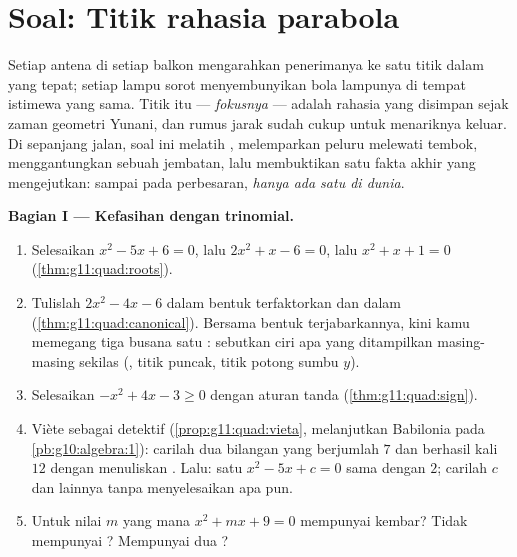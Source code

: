 \section{Soal: Titik rahasia parabola}

\begin{problem}
\label{pb:g11:quad:1}
Setiap antena  di setiap balkon mengarahkan penerimanya ke satu
titik dalam yang tepat; setiap lampu sorot menyembunyikan bola lampunya di
tempat istimewa yang sama. Titik itu --- \emph{fokusnya} --- adalah
rahasia yang disimpan  sejak zaman geometri Yunani, dan
rumus jarak sudah cukup untuk menariknya keluar. Di sepanjang jalan, soal
ini melatih , melemparkan peluru melewati tembok,
menggantungkan sebuah jembatan, lalu membuktikan satu fakta akhir yang
mengejutkan: sampai pada perbesaran, \emph{hanya ada satu  di dunia}.

\medskip
\noindent\textbf{Bagian I --- Kefasihan dengan trinomial.}
\begin{enumerate}
  \item Selesaikan $x^2 - 5x + 6 = 0$, lalu $2x^2 + x - 6 = 0$, lalu
        $x^2 + x + 1 = 0$ (\cref{thm:g11:quad:roots}).
  \item Tulislah $2x^2 - 4x - 6$ dalam bentuk terfaktorkan dan dalam  (\cref{thm:g11:quad:canonical}). Bersama bentuk
        terjabarkannya, kini kamu memegang tiga busana satu
        : sebutkan ciri apa yang ditampilkan masing-masing sekilas
        (, titik puncak, titik potong sumbu $y$).
  \item Selesaikan $-x^2 + 4x - 3 \geq 0$ dengan aturan tanda
        (\cref{thm:g11:quad:sign}).
  \item Viète sebagai detektif (\cref{prop:g11:quad:vieta},
        melanjutkan Babilonia pada \cref{pb:g10:algebra:1}): carilah dua
        bilangan yang berjumlah $7$ dan berhasil kali $12$ dengan menuliskan
        . Lalu: satu  $x^2 - 5x + c = 0$ sama dengan
        $2$; carilah $c$ dan  lainnya tanpa menyelesaikan
        apa pun.
  \item Untuk nilai $m$ yang mana $x^2 + mx + 9 = 0$ mempunyai
         kembar? Tidak mempunyai ? Mempunyai dua ?
\end{enumerate}


\end{problem}
